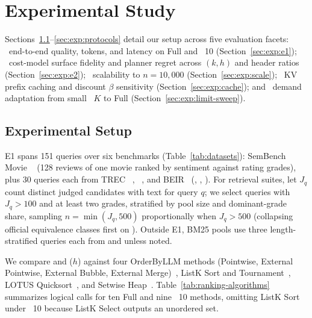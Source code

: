 \section{Experimental Study}
\label{sec:exp}

Sections~\ref{sec:exp:setup}--\ref{sec:exp:protocols} detail our setup across five evaluation facets:
~end-to-end quality, tokens, and latency on Full and \LIMIT~10 (Section~\ref{sec:exp:e1});
~cost-model surface fidelity and planner regret across $(k,h)$ and header ratios (Section~\ref{sec:exp:e2});
~scalability to $n{=}10{,}000$ (Section~\ref{sec:exp:scale});
~KV prefix caching and discount $\beta$ sensitivity (Section~\ref{sec:exp:cache}); and
~demand adaptation from small \LIMIT~$K$ to Full (Section~\ref{sec:exp:limit-sweep}).

\subsection{Experimental Setup}
\label{sec:exp:setup}

E1 spans 151 queries over six benchmarks (Table~\ref{tab:datasets}): SemBench Movie \Qnine~\cite{lao2026sembench} (128 reviews of one movie ranked by sentiment against rating grades), plus 30 queries each from TREC \DLtwozero~\cite{arxiv21trecdl20}, \DLtwotwo~\cite{arxiv25trecdl22}, and BEIR~\cite{arxiv21BEIR} (\COVID, \DBpedia, \RobustFour). For retrieval suites, let $J_q$ count distinct judged candidates with text for query $q$; we select queries with $J_q > 100$ and at least two grades, stratified by pool size and dominant-grade share, sampling $n = \min(J_q, 500)$ proportionally when $J_q > 500$ (collapsing official equivalence classes first on \DLtwotwo). Outside E1, BM25 pools use three length-stratified queries each from \DLtwozero{} and \COVID{} unless noted.



We compare \SW{} and \LT($h$) against four OrderByLLM methods (Pointwise, External Pointwise, External Bubble, External Merge)~\cite{DBLP:journals/corr/abs-2509-00303}, ListK Sort and Tournament~\cite{DBLP:journals/corr/abs-2603-17223}, LOTUS Quicksort~\cite{DBLP:journals/pvldb/PatelJPGAGZ25}, and Setwise Heap~\cite{DBLP:conf/sigir/ZhuangZKZ24}. Table~\ref{tab:ranking-algorithms} summarizes logical calls for ten Full and nine \LIMIT~10 methods, omitting ListK Sort under \LIMIT~10 because ListK Select outputs an unordered set.

